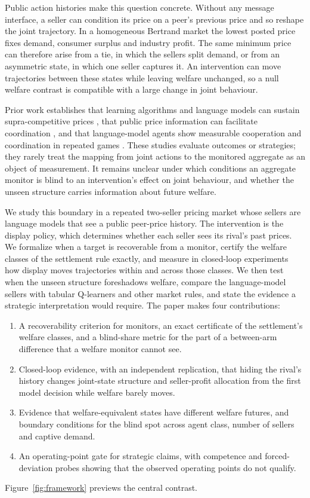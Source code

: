 \documentclass[sigconf,review,anonymous]{acmart}
\begin{document}
Public action histories make this question concrete. Without any message interface, a seller can condition its price on a peer's previous price and so reshape the joint trajectory. In a homogeneous Bertrand market the lowest posted price fixes demand, consumer surplus and industry profit. The same minimum price can therefore arise from a tie, in which the sellers split demand, or from an asymmetric state, in which one seller captures it. An intervention can move trajectories between these states while leaving welfare unchanged, so a null welfare contrast is compatible with a large change in joint behaviour.

Prior work establishes that learning algorithms and language models can sustain supra-competitive prices \cite{calvano2020ai,klein2021autonomous,fish2024algorithmic}, that public price information can facilitate coordination \cite{stigler1964theory,albaek1997government,luco2019who}, and that language-model agents show measurable cooperation and coordination in repeated games \cite{akata2025playing,piatti2024cooperate}. These studies evaluate outcomes or strategies; they rarely treat the mapping from joint actions to the monitored aggregate as an object of measurement. It remains unclear under which conditions an aggregate monitor is blind to an intervention's effect on joint behaviour, and whether the unseen structure carries information about future welfare.

We study this boundary in a repeated two-seller pricing market whose sellers are language models that see a public peer-price history. The intervention is the display policy, which determines whether each seller sees its rival's past prices. We formalize when a target is recoverable from a monitor, certify the welfare classes of the settlement rule exactly, and measure in closed-loop experiments how display moves trajectories within and across those classes. We then test when the unseen structure foreshadows welfare, compare the language-model sellers with tabular Q-learners and other market rules, and state the evidence a strategic interpretation would require. The paper makes four contributions:
\begin{enumerate}[leftmargin=*,itemsep=1pt,topsep=2pt]
    \item A recoverability criterion for monitors, an exact certificate of the settlement's welfare classes, and a blind-share metric for the part of a between-arm difference that a welfare monitor cannot see.
    \item Closed-loop evidence, with an independent replication, that hiding the rival's history changes joint-state structure and seller-profit allocation from the first model decision while welfare barely moves.
    \item Evidence that welfare-equivalent states have different welfare futures, and boundary conditions for the blind spot across agent class, number of sellers and captive demand.
    \item An operating-point gate for strategic claims, with competence and forced-deviation probes showing that the observed operating points do not qualify.
\end{enumerate}
Figure~\ref{fig:framework} previews the central contrast.
\end{document}
